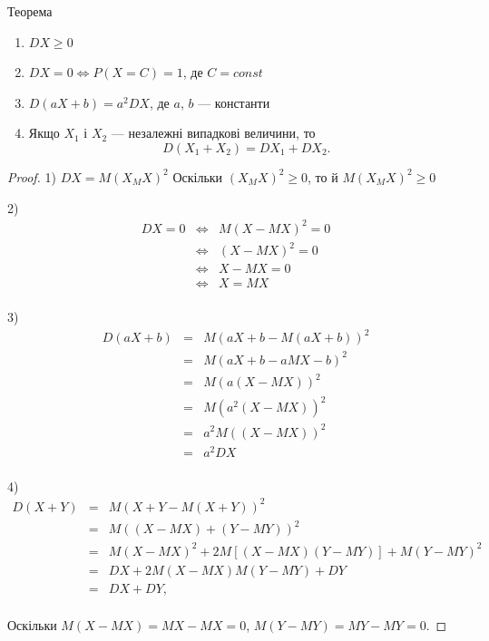 \begin{theorem}
\end{theorem}
Теорема
\begin{enumerate}
    \item $DX \geqslant 0$
    
    \item $DX = 0 \Leftrightarrow P(X=C) = 1$,
        де $C = const$

    \item $D(aX + b) = a^2 DX$, де $a$, $b$ --- константи

    \item Якщо $X_1$ і $X_2$ --- незалежні випадкові величини,
    то
    $$D(X_1 + X_2) = DX_1 + DX_2.$$
\end{enumerate}
\begin{proof}
    1) $DX = M(X _ MX)^2$
    Оскільки $(X _ MX)^2 \geqslant 0$, то й
    $M(X _ MX)^2 \geqslant 0$
    
    2) $$\begin{array}{rcl}
        DX = 0 & \Leftrightarrow & M(X - MX)^2 = 0 \\
        & \Leftrightarrow & (X - MX)^2 = 0 \\
        & \Leftrightarrow & X - MX = 0\\
        & \Leftrightarrow & X = MX \\
    \end{array}$$
    
    3) $$\begin{array}{rcl}
        D(aX+b) & = & M(aX + b - M(aX + b))^2 \\
        & = & M(aX + b - aMX - b)^2 \\
        & = & M(a(X - MX))^2 \\
        & = & M(a^2(X - MX))^2 \\
        & = & a^2 M((X - MX))^2 \\
        & = & a^2 DX \\
    \end{array}$$
    
    4) $$\begin{array}{rcl}
        D(X+Y) & = & M(X + Y - M(X+Y))^2 \\
        & = & M((X-MX) + (Y - MY))^2 \\
        & = & M(X-MX)^2 + 2M[(X-MX)(Y-MY)] + M(Y - MY)^2 \\
        & = & DX + 2M(X-MX)M(Y-MY) + DY \\
        & = & DX + DY, \\
    \end{array}$$
    
    Оскільки $M(X-MX) = MX - MX = 0$, $M(Y-MY) = MY - MY = 0$.
\end{proof}


